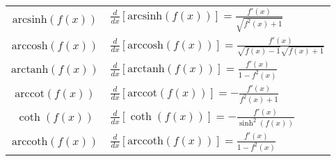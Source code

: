 \documentclass[a4paper,10pt]{article}
\theoremstyle{mystyle}
\begin{document}
\begin{center}
\begin{tabular}{c l}
    \( \text{arcsinh} (f(x)) \) & \( \frac{d}{dx} [\text{arcsinh} (f(x))] = \frac{f'(x)}{\sqrt{f^2(x) + 1}} \) \\ 
    \( \text{arccosh} (f(x)) \) & \( \frac{d}{dx} [\text{arccosh} (f(x))] = \frac{f'(x)}{\sqrt{f(x) - 1} \sqrt{f(x) + 1}} \) \\ 
    \( \text{arctanh} (f(x)) \) & \( \frac{d}{dx} [\text{arctanh} (f(x))] = \frac{f'(x)}{1 - f^2(x)} \) \\ 
    \( \text{arccot} (f(x)) \) & \( \frac{d}{dx} [\text{arccot} (f(x))] = -\frac{f'(x)}{f^2(x) + 1} \) \\ 
    \( \coth (f(x)) \) & \( \frac{d}{dx} [\coth (f(x))] = -\frac{f'(x)}{\sinh^2(f(x))} \) \\ 
    \( \text{arccoth} (f(x)) \) & \( \frac{d}{dx} [\text{arccoth} (f(x))] = \frac{f'(x)}{1 - f^2(x)} \) \\ 
    \hline
\end{tabular}
\end{center}
\end{document}
